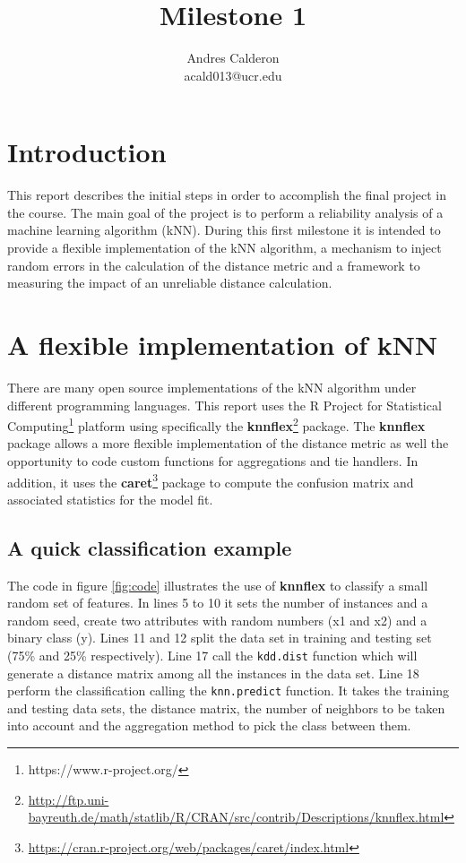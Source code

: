 \documentclass{article}\usepackage[]{graphicx}\usepackage[]{color}
\title{Milestone 1}
\author{Andres Calderon \\ acald013@ucr.edu}
\begin{document}
\maketitle

\section{Introduction}
This report describes the initial steps in order to accomplish the final project in the course. The main goal of the project is to perform a reliability analysis of a machine learning algorithm (kNN).  During this first milestone it is intended to provide a flexible implementation of the kNN algorithm, a mechanism to inject random errors in the calculation of the distance metric and a framework to measuring the impact of an unreliable distance calculation.

\section{A flexible implementation of kNN}
There are many open source implementations of the kNN algorithm under different programming languages.  This report uses the R Project for Statistical Computing\footnote{https://www.r-project.org/} platform using specifically the \textbf{knnflex}\footnote{\url{http://ftp.uni-bayreuth.de/math/statlib/R/CRAN/src/contrib/Descriptions/knnflex.html}} package. The \textbf{knnflex} package allows a more flexible implementation of the distance metric as well the opportunity to code custom functions for aggregations and tie handlers.  In addition, it uses the \textbf{caret}\footnote{\url{https://cran.r-project.org/web/packages/caret/index.html}} package to compute the confusion matrix and associated statistics for the model fit.

\subsection{A quick classification example}
The code in figure \ref{fig:code} illustrates the use of \textbf{knnflex} to classify a small random set of features.  In lines 5 to 10 it sets the number of instances and a random seed, create two attributes with random numbers (x1 and x2) and a binary class (y).  Lines 11 and 12 split the data set in training and testing set (75\% and 25\% respectively). Line 17 call the \texttt{kdd.dist} function which will generate a distance matrix among all the instances in the data set. Line 18 perform the classification calling the \texttt{knn.predict} function.  It takes the training and testing data sets, the distance matrix, the number of neighbors to be taken into account and the aggregation method to pick the class between them.  
\end{document}
